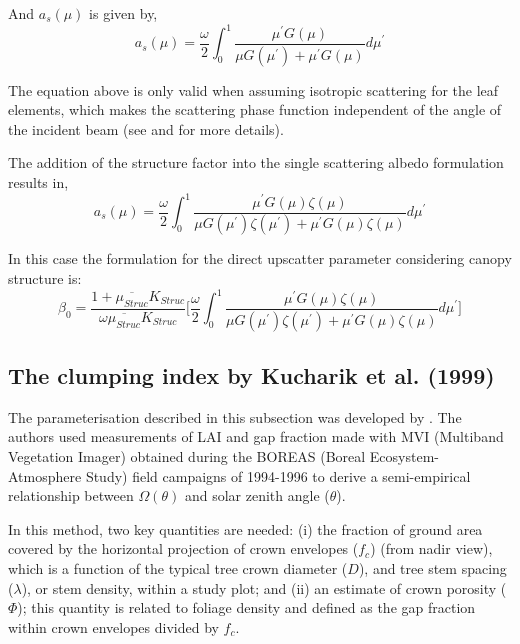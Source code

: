 And $a_s(\mu)$ is given by, 
\begin{equation}
a_s(\mu) = \frac{\omega}{2}\int_{0}^{1} \frac{\mu^\prime G(\mu)}{\mu G(\mu^\prime) + \mu^\prime G(\mu)} d\mu^\prime
\label{equation:alphas}
\end{equation}

The equation above is only valid when assuming isotropic scattering for the leaf elements, which makes the scattering phase function independent of the angle of the incident beam (see \citet{Dickinson1983} and \citet{Sellers1985} for more details). 

The addition of the structure factor into the single scattering albedo formulation results in,
\begin{equation}
a_s(\mu) = \frac{\omega}{2}\int_{0}^{1} \frac{\mu^\prime G(\mu) \zeta(\mu)}{\mu G(\mu^\prime) \zeta(\mu^\prime) + \mu^\prime G(\mu)\zeta(\mu)} d\mu^\prime
\label{equation:alphasstruct}
\end{equation}

In this case the formulation for the direct upscatter parameter considering canopy structure is: 
\begin{equation}
\beta_0 = \frac{1 + \overline{\mu_{Struc}}K_{Struc}}{\omega\overline{\mu_{Struc}}K_{Struc}}
\bigg[\frac{\omega}{2}\int_{0}^{1} \frac{\mu^\prime G(\mu) \zeta(\mu)}{\mu G(\mu^\prime) \zeta(\mu^\prime) + \mu^\prime G(\mu)\zeta(\mu)} d\mu^\prime \bigg]
\label{equation:alphasstruct}
\end{equation}

\subsection{The clumping index by Kucharik et al. (1999)}
The parameterisation described in this subsection was developed by \citet{Kucharik1999}. The authors used measurements of LAI and gap fraction made with MVI (Multiband Vegetation Imager) \citep{Kucharik1997} obtained during the BOREAS (Boreal Ecosystem-Atmosphere Study) \citep{Sellers1997} field campaigns of 1994-1996 to derive a semi-empirical relationship between $\Omega(\theta)$ and solar zenith angle ($\theta$). 

In this method, two key quantities are needed: (i) the fraction of ground area covered by the horizontal projection of crown envelopes ($f_c$) (from nadir view), which is a function of the typical tree crown diameter ($D$), and tree stem spacing ($\lambda$), or stem density, within a study plot; and (ii) an estimate of crown porosity ($\Phi$); this quantity is related to foliage density and defined as the gap fraction within crown envelopes divided by $f_c$.
 
